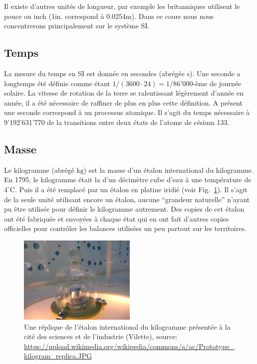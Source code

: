 \documentclass[a4paper,12pt]{book}
\newcommand{\m}{\mathrm{m}}
\newcommand{\s}{\mathrm{s}}
\newcommand{\kg}{\mathrm{kg}}
\newcommand{\C}{\mathrm{C}}
\begin{document}
Il existe d'autres unités de longueur, par exemple les britanniques utilisent le pouce  ou inch (1$\mathrm{in.}$ correspond à 0.0254$\m$). Dans ce cours nous nous concentrerons principalement
sur le système SI.

\subsection{Temps}

La mesure du temps en SI est donnée en secondes (abrégée $\s$). Une seconde a longtemps été définie comme étant $1/(3600\cdot 24)=1/86'000$-ème
de journée solaire. La vitesse de rotation de la terre se ralentissant légèrement d'année en année, il a été nécessaire de raffiner de plus en plus 
cette définition. A présent une seconde correspond à un processus atomique. Il s'agit du temps nécessaire à 9'192'631'770 de 
la transitions entre deux états de l'atome de césium 133. 

\subsection{Masse}

Le kilogramme (abrégé $\kg$) est la masse d'un étalon international du kilogramme. En 1795, le kilogramme était la d'un décimètre cube 
d'eau à une température de $4^\circ\C$. Puis il a été remplacé par un étalon en platine iridié (voir Fig.~\ref{fig_kg}). Il s'agit de la seule unité utilisant encore un étalon, 
aucune ``grandeur naturelle'' n'ayant pu être utilisée pour définir le kilogramme autrement. Des copies de cet étalon ont été fabriquée et envoyées à
chaque état qui en ont fait d'autres copies officielles pour contrôler les balances utilisées un peu partout sur les territoires.
\begin{figure}
\begin{center}
\includegraphics[width=0.5\textwidth]{figs/kilogram_replica.jpg}
\caption{Une réplique de l'étalon international du kilogramme présentée à la cité des sciences et de l'industrie (Vilette), source: \url{https://upload.wikimedia.org/wikipedia/commons/a/ac/Prototype_kilogram_replica.JPG}}
\label{fig_kg}
\end{center}
\end{figure}
\end{document}
